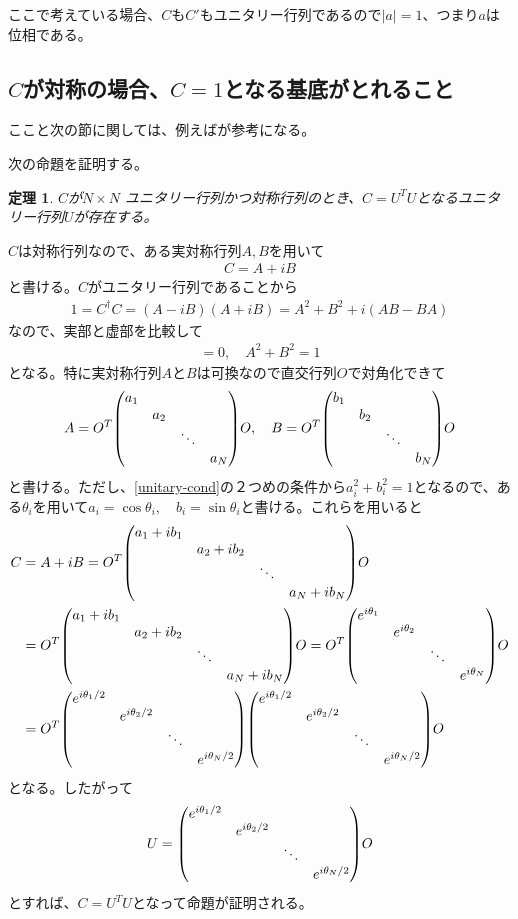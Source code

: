 \documentclass[12pt,a4paper,dvipdfmx]{jlreq}
\newtheorem{theo}{定理}
\begin{document}
ここで考えている場合、$C$も$C'$もユニタリー行列であるので$|a|=1$、つまり$a$は位相である。


\subsection{$C$が対称の場合、$C=1$となる基底がとれること}
\label{app:symmetric}
ここと次の節に関しては、例えば\cite{Zumino}が参考になる。

次の命題を証明する。
\begin{theo}
  $C$が$N\times N$ ユニタリー行列かつ対称行列のとき、$C=U^TU$となるユニタリー行列$U$が存在する。
\end{theo}

$C$は対称行列なので、ある実対称行列$A,B$を用いて
\begin{align*}
  C=A+iB
\end{align*}
と書ける。$C$がユニタリー行列であることから
\begin{align*}
  1=C^{\dag}C=(A-iB)(A+iB)=A^2+B^2+i(AB-BA)
\end{align*}
なので、実部と虚部を比較して
\begin{align}
  [A,B]=0,\quad A^2+B^2=1
  \label{unitary-cond}
\end{align}
となる。特に実対称行列$A$と$B$は可換なので直交行列$O$で対角化できて
\begin{align*}
  A=O^T 
  \mqty(\dmat{a_1,a_2,\ddots,a_N})
  O,\quad
  B=O^T 
  \mqty(\dmat{b_1,b_2,\ddots,b_N})
  O
\end{align*}
と書ける。ただし、\eqref{unitary-cond}の２つめの条件から$a_i^2+b_i^2=1$となるので、ある$\theta_i$を用いて$a_i=\cos\theta_i,\quad b_i=\sin \theta_i$と書ける。これらを用いると
\begin{align}
  C&=A+iB
  =O^{T}
  \mqty(\dmat{a_1+ib_1,a_2+ib_2,\ddots,a_N+ib_N})
  O\\
  &=O^T
  \mqty(\dmat{a_1+ib_1,a_2+ib_2,\ddots,a_N+ib_N})
  O
  =O^T
  \mqty(\dmat{e^{i\theta_1},e^{i\theta_2},\ddots,e^{i\theta_N}})
  O\\
  &=O^T
  \mqty(\dmat{e^{i\theta_1/2},e^{i\theta_2/2},\ddots,e^{i\theta_N/2}})
  \mqty(\dmat{e^{i\theta_1/2},e^{i\theta_2/2},\ddots,e^{i\theta_N/2}})
  O
\end{align}
となる。したがって
\begin{align*}
  U=  \mqty(\dmat{e^{i\theta_1/2},e^{i\theta_2/2},\ddots,e^{i\theta_N/2}})
  O
\end{align*}
とすれば、$C=U^TU$となって命題が証明される。
\end{document}
